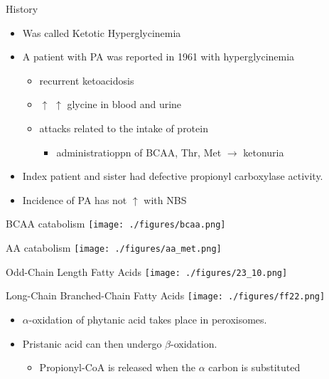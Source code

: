 \documentclass[presentation, smaller]{beamer}
\begin{document}
\begin{frame}[label={sec:orgheadline1}]{History}
\begin{itemize}
\item Was called Ketotic Hyperglycinemia
\item A patient with PA was reported in 1961 with hyperglycinemia
\begin{itemize}
\item recurrent ketoacidosis
\item \(\uparrow\) \(\uparrow\) glycine in blood and urine
\item attacks related to the intake of protein
\begin{itemize}
\item administratioppn of BCAA, Thr, Met \(\to\) ketonuria
\end{itemize}
\end{itemize}
\item Index patient and sister had defective propionyl carboxylase activity.
\item Incidence of PA has not \(\uparrow\) with NBS
\end{itemize}
\centering
{}
\end{frame}
\begin{frame}[label={sec:orgheadline2}]{BCAA catabolism}
\centering
\texttt{[image: ./figures/bcaa.png]}
\end{frame}

\begin{frame}[label={sec:orgheadline3}]{AA catabolism}
\texttt{[image: ./figures/aa\_met.png]}
\end{frame}
\begin{frame}[label={sec:orgheadline4}]{Odd-Chain Length Fatty Acids}
\centering
\texttt{[image: ./figures/23\_10.png]}
\end{frame}

\begin{frame}[label={sec:orgheadline5}]{Long-Chain Branched-Chain Fatty Acids}
\centering
\texttt{[image: ./figures/ff22.png]}

\begin{itemize}
\item \(\alpha\)-oxidation of phytanic acid takes place in peroxisomes.
\item Pristanic acid can then undergo \(\beta\)-oxidation.
\begin{itemize}
\item Propionyl-CoA is released when the \(\alpha\) carbon is substituted
\end{itemize}
\end{itemize}
\end{frame}
\end{document}
